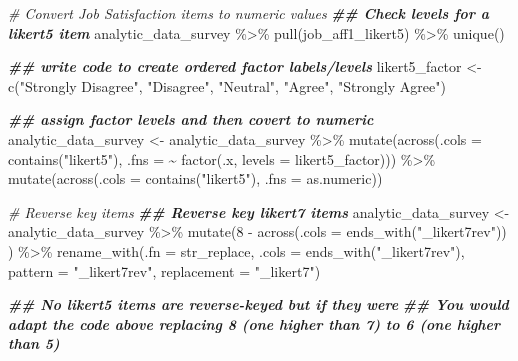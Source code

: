 \documentclass[
]{krantz}
\makeatletter
\newenvironment{Shaded}{\begin{snugshade}}{\end{snugshade}}
\newcommand{\AttributeTok}[1]{\textcolor[rgb]{0.61,0.61,0.61}{#1}}
\newcommand{\CommentTok}[1]{\textcolor[rgb]{0.37,0.37,0.37}{\textit{#1}}}
\newcommand{\DecValTok}[1]{\textcolor[rgb]{0.06,0.06,0.06}{#1}}
\newcommand{\DocumentationTok}[1]{\textcolor[rgb]{0.37,0.37,0.37}{\textbf{\textit{#1}}}}
\newcommand{\FunctionTok}[1]{\textcolor[rgb]{0,0,0}{#1}}
\newcommand{\NormalTok}[1]{#1}
\newcommand{\OtherTok}[1]{\textcolor[rgb]{0.37,0.37,0.37}{#1}}
\newcommand{\SpecialCharTok}[1]{\textcolor[rgb]{0,0,0}{#1}}
\newcommand{\StringTok}[1]{\textcolor[rgb]{0.5,0.5,0.5}{#1}}
\newenvironment{kframe}{%
\medskip{}
\setlength{\fboxsep}{.8em}
 \def\at@end@of@kframe{}%
 \ifinner\ifhmode%
  \def\at@end@of@kframe{\end{minipage}}%
  \begin{minipage}{\columnwidth}%
 \fi\fi%
 \def\FrameCommand##1{\hskip\@totalleftmargin \hskip-\fboxsep
 \colorbox{shadecolor}{##1}\hskip-\fboxsep
     \hskip-\linewidth \hskip-\@totalleftmargin \hskip\columnwidth}%
 \MakeFramed {\advance\hsize-\width
   \@totalleftmargin\z@ \linewidth\hsize
   \@setminipage}}%
 {\par\unskip\endMakeFramed%
 \at@end@of@kframe}
\renewenvironment{Shaded}{\begin{kframe}}{\end{kframe}}
\makeatother
\begin{document}
\begin{Shaded}
\begin{Highlighting}[]
\CommentTok{\# Convert Job Satisfaction items to numeric  values}
\DocumentationTok{\#\# Check levels for a likert5 item}
\NormalTok{analytic\_data\_survey }\SpecialCharTok{\%\textgreater{}\%}
  \FunctionTok{pull}\NormalTok{(job\_aff1\_likert5) }\SpecialCharTok{\%\textgreater{}\%}
  \FunctionTok{unique}\NormalTok{()}

\DocumentationTok{\#\# write code to create ordered factor labels/levels}
\NormalTok{likert5\_factor }\OtherTok{\textless{}{-}} \FunctionTok{c}\NormalTok{(}\StringTok{"Strongly Disagree"}\NormalTok{,}
                    \StringTok{"Disagree"}\NormalTok{,}
                    \StringTok{"Neutral"}\NormalTok{,}
                    \StringTok{"Agree"}\NormalTok{,}
                    \StringTok{"Strongly Agree"}\NormalTok{)}

\DocumentationTok{\#\# assign factor levels and then covert to numeric}
\NormalTok{analytic\_data\_survey }\OtherTok{\textless{}{-}}\NormalTok{ analytic\_data\_survey }\SpecialCharTok{\%\textgreater{}\%}
  \FunctionTok{mutate}\NormalTok{(}\FunctionTok{across}\NormalTok{(}\AttributeTok{.cols =} \FunctionTok{contains}\NormalTok{(}\StringTok{"likert5"}\NormalTok{), }
                \AttributeTok{.fns =} \SpecialCharTok{\textasciitilde{}} \FunctionTok{factor}\NormalTok{(.x, }\AttributeTok{levels =}\NormalTok{ likert5\_factor))) }\SpecialCharTok{\%\textgreater{}\%}
  \FunctionTok{mutate}\NormalTok{(}\FunctionTok{across}\NormalTok{(}\AttributeTok{.cols =} \FunctionTok{contains}\NormalTok{(}\StringTok{"likert5"}\NormalTok{), }
                \AttributeTok{.fns =}\NormalTok{ as.numeric))}

\CommentTok{\# Reverse key items}
\DocumentationTok{\#\# Reverse key likert7 items}
\NormalTok{analytic\_data\_survey }\OtherTok{\textless{}{-}}\NormalTok{ analytic\_data\_survey }\SpecialCharTok{\%\textgreater{}\%} 
  \FunctionTok{mutate}\NormalTok{(}\DecValTok{8} \SpecialCharTok{{-}} \FunctionTok{across}\NormalTok{(}\AttributeTok{.cols =} \FunctionTok{ends\_with}\NormalTok{(}\StringTok{"\_likert7rev"}\NormalTok{)) ) }\SpecialCharTok{\%\textgreater{}\%} 
  \FunctionTok{rename\_with}\NormalTok{(}\AttributeTok{.fn =}\NormalTok{ str\_replace,}
              \AttributeTok{.cols =} \FunctionTok{ends\_with}\NormalTok{(}\StringTok{"\_likert7rev"}\NormalTok{),}
              \AttributeTok{pattern =} \StringTok{"\_likert7rev"}\NormalTok{,}
              \AttributeTok{replacement =} \StringTok{"\_likert7"}\NormalTok{)}

\DocumentationTok{\#\# No likert5 items are reverse{-}keyed but if they were}
\DocumentationTok{\#\# You would adapt the code above replacing 8 (one higher than 7) to 6 (one higher than 5)}



\end{Highlighting}
\end{Shaded}
\end{document}
